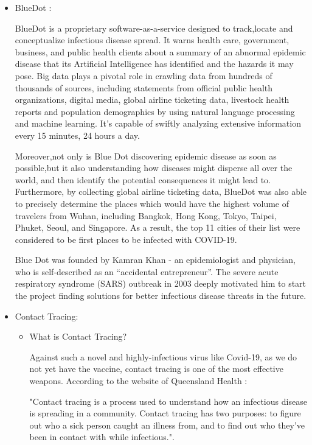 \begin{itemize}
        \item BlueDot \parencite{BlueDotHome} \parencite{BlueDotCNBC}:
        \par BlueDot is a proprietary software-as-a-service designed to track,locate and conceptualize infectious disease spread. It warns health care, government, business, and public health clients about a summary of an abnormal epidemic disease that its Artificial Intelligence has identified and the hazards it may pose. Big data plays a pivotal role in crawling data from hundreds of thousands of sources, including statements from official public health organizations, digital media, global airline ticketing data, livestock health reports and population demographics by using natural language processing and machine learning. It’s capable of swiftly analyzing extensive information every 15 minutes, 24 hours a day.
        \par Moreover,not only is Blue Dot discovering epidemic disease as soon as possible,but it also understanding how diseases might disperse all over the world, and then identify the potential consequences it might lead to. Furthermore, by collecting global airline ticketing data, BlueDot was also able to precisely determine the places which would have the highest volume of travelers from Wuhan, including Bangkok, Hong Kong, Tokyo, Taipei, Phuket, Seoul, and Singapore. As a result, the top 11 cities of their list were considered to be first places to be infected with COVID-19.
        \par Blue Dot was founded by Kamran Khan - an epidemiologist and physician, who is self-described as an “accidental entrepreneur”. The severe acute respiratory syndrome (SARS) outbreak in 2003 deeply motivated him to start the project finding solutions for better infectious disease threats in the future.

        \item Contact Tracing:
        \begin{itemize}
          \item What is Contact Tracing?
          \par Against such a novel and highly-infectious virus like Covid-19, as we do not yet have the vaccine, contact tracing is one of the most effective weapons. According to the website of Queensland Health \parencite{QueenslandHealth}:
          \par "Contact tracing is a process used to understand how an infectious disease is spreading in a community. Contact tracing has two purposes: to figure out who a sick person caught an illness from, and to find out who they’ve been in contact with while infectious.".


\end{itemize}
\end{itemize}
